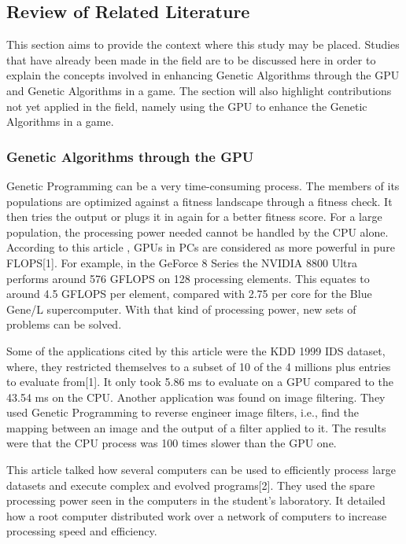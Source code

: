 \subsection*{Review of Related Literature}

	This section aims to provide the context where this study may be placed. 
	Studies that have already been made in the field are to be discussed here in order to 
	explain the concepts involved in enhancing Genetic Algorithms through the GPU and 
	Genetic Algorithms in a game. The section will also highlight contributions not yet 
	applied in the field, namely using the GPU to enhance the Genetic Algorithms in a game.

\subsubsection*{Genetic Algorithms through the GPU}
	

	Genetic Programming can be a very time-consuming process.  The members of its populations are optimized against a fitness landscape through a fitness check.  
	It then tries the output or plugs it in again for a better fitness score. For a large population, the processing power needed cannot be handled by the CPU alone.  
	According to this article , GPUs in PCs are considered as more powerful in pure FLOPS[1].  For example, in the GeForce 8 Series the NVIDIA 8800 Ultra performs around 576 GFLOPS 
	on 128 processing elements.  This equates to around 4.5 GFLOPS per element, compared with 2.75 per core for the Blue Gene/L supercomputer.  With that kind of processing power, 
	new sets of problems can be solved.  

	Some of the applications cited by this article were the KDD 1999 IDS dataset, where, they restricted themselves to a subset of 10%
	of the 4 millions plus entries to evaluate from[1].  It only took 5.86 ms to evaluate on a GPU compared to the 43.54 ms on the CPU.  Another application was found on image filtering.  
	They used Genetic Programming to reverse engineer image filters, i.e., find the mapping between an image and the output of a filter applied to it.  The results were that the CPU process 
	was 100 times slower than the GPU one.  

	This article talked how several computers can be used to efficiently process large datasets and execute complex and evolved programs[2].  
	They used the spare processing power seen in the computers in the student's laboratory.  It detailed how a root computer distributed work over a network of computers to increase processing speed and efficiency.
	
